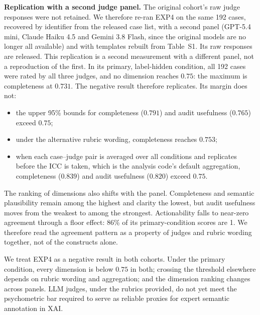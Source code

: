 \documentclass[10pt,a4paper,twoside]{article}
\begin{document}
\textbf{Replication with a second judge panel.} The original cohort's raw
judge responses were not retained. We therefore re-ran EXP4 on the same 192
cases, recovered by identifier from the released case list, with a second
panel (GPT-5.4 mini, Claude Haiku 4.5 and Gemini 3.8 Flash, since the
original models are no longer all available) and with templates rebuilt from
Table~S1. Its raw responses are released. This replication is a
second measurement with a different panel, not a reproduction of the first.
In its primary, label-hidden condition, all 192 cases were rated by all three
judges, and no dimension reaches $0.75$: the maximum is completeness at
$0.731$. The negative result therefore replicates. Its margin does not:
\begin{itemize}
\item the upper 95\% bounds for completeness ($0.791$) and audit usefulness
  ($0.765$) exceed $0.75$;
\item under the alternative rubric wording, completeness reaches $0.753$;
\item when each case--judge pair is averaged over all conditions and
  replicates before the ICC is taken, which is the analysis code's default
  aggregation, completeness ($0.839$) and audit usefulness ($0.820$) exceed
  $0.75$.
\end{itemize}
The ranking of dimensions also shifts with the panel. Completeness and semantic
plausibility remain among the highest and clarity the lowest, but audit
usefulness moves from the weakest to among the strongest. Actionability falls
to near-zero agreement through a floor effect: 86\% of its primary-condition
scores are 1. We therefore read the agreement pattern as a property of judges and rubric
wording together, not of the constructs alone.

We treat EXP4 as a negative result in both cohorts. Under the primary
condition, every dimension is below $0.75$ in both; crossing the threshold
elsewhere depends on rubric wording and aggregation; and the dimension
ranking changes across panels. LLM judges, under the rubrics provided, do not
yet meet the psychometric bar required to serve as reliable proxies for
expert semantic annotation in XAI.
\end{document}
